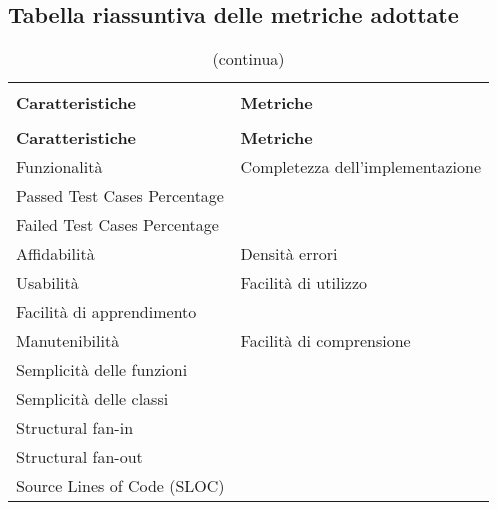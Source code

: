 \pagebreak

\subsection{Tabella riassuntiva delle metriche adottate}
\begin{longtable}{ >{\centering}p{}
		>{\centering}p{}}
	\rowcolor{white}\caption{Tabella riassuntiva delle metriche adottate}\\
	\rowcolorhead
	\textbf{\color{white}Caratteristiche}
	& \textbf{\color{white}Metriche}
	\tabularnewline 	
	\endfirsthead
	\rowcolor{white}\caption[]{(continua)} \\
	\rowcolorhead 
	\textbf{\color{white}Caratteristiche}
	& \textbf{\color{white}Metriche} 
	\tabularnewline
	\endhead
	
	Funzionalità & Completezza dell'implementazione\\ Passed Test Cases Percentage \\ Failed Test Cases Percentage
	
	\tabularnewline
	\rowcolordark
	Affidabilità & Densità errori 
	
	\tabularnewline
	\rowcolorlight
	Usabilità & Facilità di utilizzo\\ Facilità di apprendimento
	
	\tabularnewline
	\rowcolordark
	Manutenibilità & Facilità di comprensione\\
	Semplicità delle funzioni \\Semplicità delle classi \\ Structural fan-in \\Structural fan-out \\Source Lines of Code (SLOC)
	\tabularnewline
	
\end{longtable}
